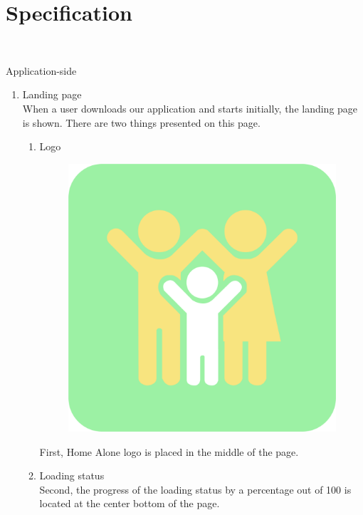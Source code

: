 \documentclass[conference]{IEEEtran}
\begin{document}
\section{\Large{Specification}}\\
\begin{center}\large{Application-side}\end{center}
\begin{enumerate}[label=\arabic*.]
    \item {\large{Landing page}} \\
    When a user downloads our application and starts initially, the landing page is shown. There are two things presented on this page. \\
    \begin{enumerate}[label=\alph*.]
        \item {\large{Logo}} \\
        \begin{figure}[H]\centering\includegraphics[scale=0.08]{images/logo.png}\end{figure}    
        First, Home Alone logo is placed in the middle of the page. \\
        \item {\large{Loading status}} \\
        Second, the progress of the loading status by a percentage out of 100 is located at the center bottom of the page. \\

\end{enumerate}
\end{enumerate}
\end{document}
